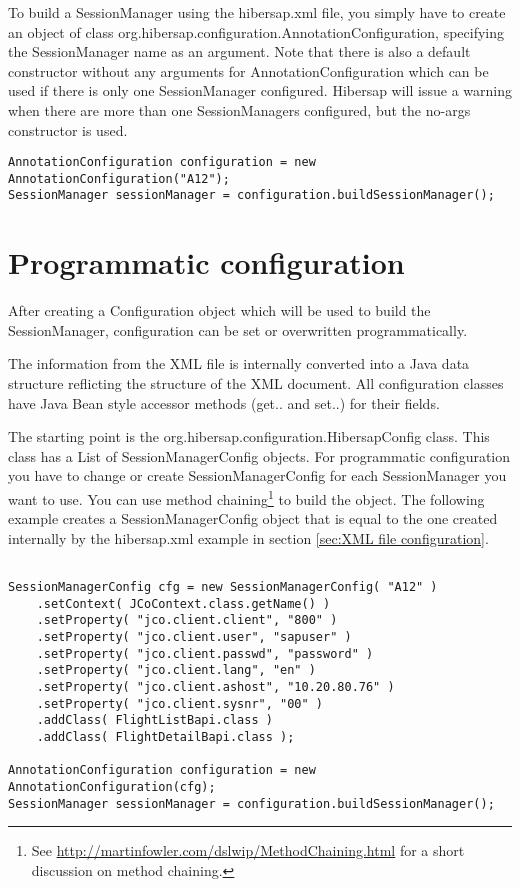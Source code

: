 To build a SessionManager using the hibersap.xml file, you simply have to create an object of
class org.\-hibersap.\-configuration.\-AnnotationConfiguration, specifying the SessionManager name as an argument. Note 
that there is also a default constructor without any arguments for AnnotationConfiguration which can be used if there 
is only one SessionManager configured. Hibersap will issue a warning when there are more than one SessionManagers 
configured, but the no-args constructor is used. 

\begin{Verbatim}[frame=single,label=hibersap.xml]
AnnotationConfiguration configuration = new AnnotationConfiguration("A12");
SessionManager sessionManager = configuration.buildSessionManager();
\end{Verbatim}


\section{Programmatic configuration}
\label{sec:Programmatic configuration}

After creating a Configuration object which will be used to build the SessionManager, configuration can be set or
overwritten programmatically.

The information from the XML file is internally converted into a Java data structure reflicting the structure of the
XML document. All configuration classes have Java Bean style accessor methods (get.. and set..) for
their fields. 

The starting point is the org.hibersap.configuration.HibersapConfig class. This class has a List of
SessionManagerConfig objects. For programmatic configuration you have to change or create SessionManagerConfig for each 
SessionManager you want to use. You can use method chaining\footnote{See
\url{http://martinfowler.com/dslwip/MethodChaining.html} for a short discussion on method chaining.} to build the
object. The following example creates a  SessionManagerConfig object that is equal to the one created internally by the
hibersap.xml example in section \ref{sec:XML file configuration}. 

\begin{Verbatim}[frame=single,label=Programmatic configuration]

SessionManagerConfig cfg = new SessionManagerConfig( "A12" )
    .setContext( JCoContext.class.getName() )
    .setProperty( "jco.client.client", "800" )
    .setProperty( "jco.client.user", "sapuser" )
    .setProperty( "jco.client.passwd", "password" )
    .setProperty( "jco.client.lang", "en" )
    .setProperty( "jco.client.ashost", "10.20.80.76" )
    .setProperty( "jco.client.sysnr", "00" )
    .addClass( FlightListBapi.class )
    .addClass( FlightDetailBapi.class );

AnnotationConfiguration configuration = new AnnotationConfiguration(cfg);
SessionManager sessionManager = configuration.buildSessionManager();

\end{Verbatim}








